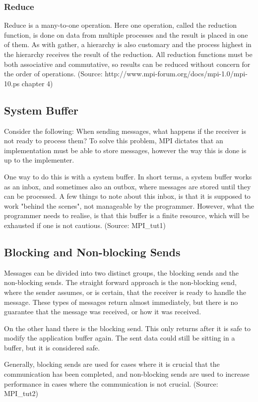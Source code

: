 \subsubsection{Reduce}
Reduce is a many-to-one operation. Here one operation, called the reduction function, is done on data from multiple processes and the result is placed in one of them. As with gather, a hierarchy is also customary and the process highest in the hierarchy receives the result of the reduction. All reduction functions must be both associative and commutative, so results can be reduced without concern for the order of operations.
(Source: http://www.mpi-forum.org/docs/mpi-1.0/mpi-10.ps chapter 4)

\subsection{System Buffer}
Consider the following: When sending messages, what happens if the receiver is not ready to process them? To solve this problem, MPI dictates that an implementation must be able to store messages, however the way this is done is up to the implementer.

One way to do this is with a system buffer. In short terms, a system buffer works as an inbox, and sometimes also an outbox, where messages are stored until they can be processed. A few things to note about this inbox, is that it is supposed to work "behind the scenes", not manageable by the programmer. However, what the programmer needs to realise, is that this buffer is a finite resource, which will be exhausted if one is not cautious.
(Source: MPI\_tut1)

\subsection{Blocking and Non-blocking Sends}
Messages can be divided into two distinct groups, the blocking sends and the non-blocking sends. The straight forward approach is the non-blocking send, where the sender assumes, or is certain, that the receiver is ready to handle the message. These types of messages return almost immediately, but there is no guarantee that the message was received, or how it was received.

On the other hand there is the blocking send. This only returns after it is safe to modify the application buffer again. The sent data could still be sitting in a buffer, but it is considered safe.

Generally, blocking sends are used for cases where it is crucial that the communication has been completed, and non-blocking sends are used to increase performance in cases where the communication is not crucial.
(Source: MPI\_tut2)

